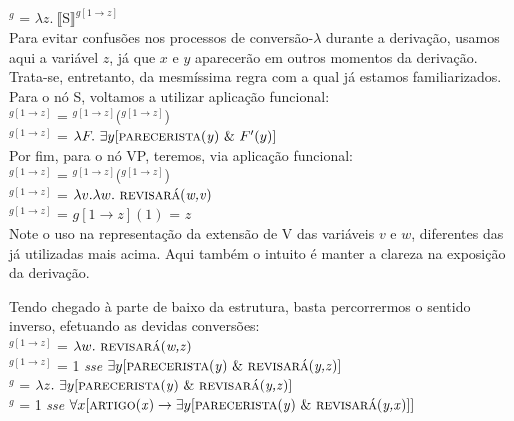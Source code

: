 \n {}$^{g}$ = $\lambda z.\
\llbracket\text{S}\rrbracket^{g[1\rightarrow z]}$\\

\n Para evitar confusões nos processos de conversão-$\lambda$ durante a derivação, usamos aqui a variável $z$, já que $x$ e $y$ aparecerão em outros momentos da derivação. Trata-se, entretanto, da mesmíssima regra com a qual já estamos familiarizados. Para o nó S, voltamos a utilizar aplicação funcional:\\

\n {}$^{g[1\rightarrow z]}$ = $^{g[1\rightarrow
z]}$($^{g[1\rightarrow z]}$) \\

\n {}$^{g[1\rightarrow z]}$ = $\lambda F.\
\exists y [\text{\textsc{parecerista}(\textit{y})}\ \&\ F'(y)]$\\

\n Por fim, para o nó VP, teremos, via aplicação funcional:\\

\n {}$^{g[1\rightarrow z]}$ = $^{g[1\rightarrow z]}$($^{g[1\rightarrow z]}$)\\

\n \den{V}$^{g[1\rightarrow z]}$ = $\lambda v.\lambda w.\ \predica{revisará}{w,v}$\\

\n \den{t$_{1}$}$^{g[1\rightarrow z]}$ = $g[1\rightarrow z](1)$ = $z$\\

\n Note o uso na representação da extensão de V das variáveis $v$ e $w$, diferentes das já utilizadas mais acima. Aqui também o intuito é manter a clareza na exposição da derivação.

Tendo chegado à parte de baixo da estrutura, basta percorrermos o sentido inverso, efetuando as devidas conversões: \\

\n \den{VP}$^{g[1\rightarrow z]}$ = $\lambda w.\ \predica{revisará}{w,z}$\\

\n \den{S}$^{g[1\rightarrow z]}$ = 1 \textit{sse} $\exists y [\predica{parecerista}{y}\ \&\ \predica{revisará}{y,z}]$\\

\n \den{S$'$}$^{g}$ = $\lambda z.\ \exists y [\predica{parecerista}{y}\ \&\ \predica{revisará}{y,z}]$\\

\n \den{S$''$}$^{g}$ = 1 \textit{sse} $\forall x [\predica{artigo}{x} \rightarrow \exists y [\predica{parecerista}{y}\ \&\ \predica{revisará}{y,x}]]$\\

